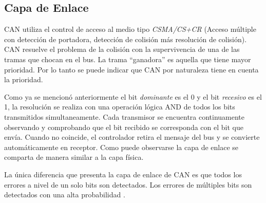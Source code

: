 \subsection{Capa de Enlace}\label{subsec:capa_enlace}
CAN utiliza el control de acceso al medio tipo \textit{CSMA/CS+CR} (Acceso múltiple con detección de portadora, detección de colisión más resolución de colisión). CAN resuelve el problema de la colisión con la supervivencia de una de las tramas que chocan en el bus. La trama ``ganadora'' es aquella que tiene mayor prioridad. Por lo tanto se puede indicar que CAN por naturaleza tiene en cuenta la prioridad.

Como ya se mencionó anteriormente el bit \textit{dominante} es el 0 y el bit \textit{recesivo} es el 1, la resolución se realiza con una operación lógica AND de todos los bits transmitidos simultaneamente. Cada transmisor se encuentra continuamente
observando y comprobando que el bit recibido se corresponda con el bit que envía. Cuando no coincide, el controlador retira el mensaje del bus y se convierte automáticamente en receptor. Como puede observarse la capa de enlace se comparta de manera similar a la capa física.

La única diferencia que presenta la capa de enlace de CAN es que todos los errores a nivel de un solo bits son detectados. Los errores de múltiples bits son detectados con una alta probabilidad \citep{can-ciaWEB}.
